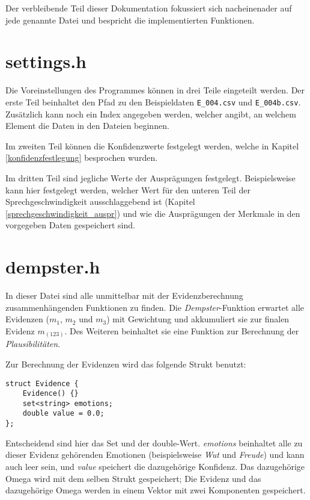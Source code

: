  Der verbleibende Teil dieser Dokumentation fokussiert sich nacheinenader auf jede genannte Datei und bespricht die implementierten Funktionen.

\section{settings.h}
Die Voreinstellungen des Programmes können in drei Teile eingeteilt werden.
Der erste Teil beinhaltet den Pfad zu den Beispieldaten \verb|E_004.csv| und \verb|E_004b.csv|. Zusätzlich kann noch ein Index angegeben werden, welcher angibt, an welchem Element die Daten in den Dateien beginnen.

Im zweiten Teil können die Konfidenzwerte festgelegt werden, welche in Kapitel \ref{konfidenzfestlegung} besprochen wurden.

Im dritten Teil sind jegliche Werte der Ausprägungen festgelegt. Beispielsweise kann hier festgelegt werden, welcher Wert für den unteren Teil der Sprechgeschwindigkeit ausschlaggebend ist (Kapitel \ref{sprechgeschwindigkeit_auspr}) und wie die Ausprägungen der Merkmale in den vorgegeben Daten gespeichert sind.

\section{dempster.h}
In dieser Datei sind alle unmittelbar mit der Evidenzberechnung zusammenhängenden Funktionen zu finden. Die \textit{Dempster}-Funktion erwartet alle Evidenzen (\(m_1\), \(m_2\) und \(m_3\)) mit Gewichtung und akkumuliert sie zur finalen Evidenz \(m_(123)\). Des Weiteren beinhaltet sie eine Funktion zur Berechnung der \textit{Plausibilitäten}.

Zur Berechnung der Evidenzen wird das folgende Strukt benutzt:

\begin{lstlisting}[caption=Strukt zur Evidenzberechnung, label=structcode]
struct Evidence {
	Evidence() {}
	set<string> emotions;
	double value = 0.0;
};
\end{lstlisting}

Entscheidend sind hier das Set und der double-Wert. \textit{emotions} beinhaltet alle zu dieser Evidenz gehörenden Emotionen (beispielsweise \textit{Wut} und \textit{Freude}) und kann auch leer sein, und \textit{value} speichert die dazugehörige Konfidenz. Das dazugehörige Omega wird mit dem selben Strukt gespeichert; 
Die Evidenz und das dazugehörige Omega werden in einem Vektor mit zwei Komponenten gespeichert.

